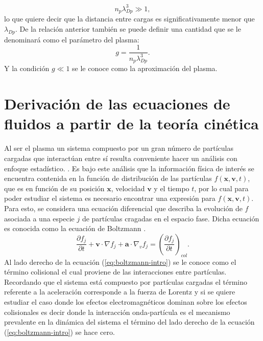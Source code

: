 \documentclass[../tesis_main_file.tex]{subfiles}
\begin{document}
\begin{equation}
n_p \lambda_{Dp}^3 \gg 1,
\end{equation}
lo que quiere decir que la distancia entre cargas es significativamente menor que $\lambda_{Dp}$. De la relación anterior también se puede definir una cantidad que se le denominará como el parámetro del plasma:
\begin{equation}
g= \frac{1}{n_p \lambda_{Dp}^3}.
\end{equation}
Y la condición $g \ll 1$ se le conoce como la aproximación del plasma.

\section{Derivación de las ecuaciones de fluidos a partir de la teoría cinética}
Al ser el plasma un sistema compuesto por un gran número de partículas cargadas que interactúan entre sí resulta conveniente hacer un análisis con enfoque estadístico.  \cite{bittencourt2013fundamentals}.
Es bajo este análisis que la información física de interés se encuentra contenida en la función de distribución de las partículas $f(\textbf{x},\textbf{v},t)$, que es en función de su posición $\textbf{x}$, velocidad $\textbf{v}$ y el tiempo $t$, por lo cual para poder estudiar el sistema es necesario encontrar una expresión para $f(\textbf{x},\textbf{v},t)$.\\
Para esto, se considera una ecuación diferencial que describa la evolución de $f$ asociada a una especie $j$ de partículas cragadas en el espacio fase.
 Dicha ecuación es conocida como la ecuación de Boltzmann \cite{jardin2010computational} .
\begin{equation}
\label{eq:boltzmann-intro}
\frac{\partial f_j}{\partial t}+ \textbf{v}\cdot \nabla f_j + \textbf{a}\cdot \nabla _v f_j=\left(\frac{\partial f_j}{\partial t}\right)_{col}.
\end{equation}
Al lado derecho  de la ecuación (\ref{eq:boltzmann-intro}) se le conoce como el término colisional el cual proviene de las interacciones entre partículas.
Recordando que el sistema está compuesto por partículas cargadas el término referente a la aceleración corresponde a la fuerza de Lorentz y si se quiere estudiar el caso donde los efectos electromagnéticos dominan sobre los efectos colisionales es decir donde la interacción onda-partícula es el mecanismo prevalente en la dinámica del sistema el término del lado derecho de la ecuación (\ref{eq:boltzmann-intro}) se hace cero.
\end{document}
